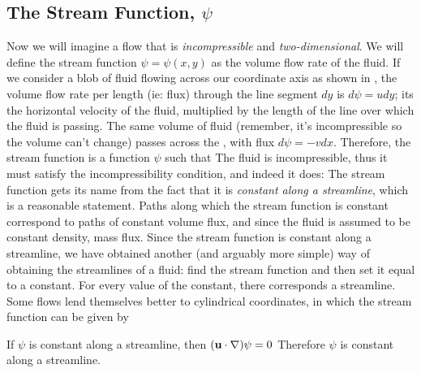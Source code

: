 \documentclass[12pt]{book}
\begin{document}
\subsection{The Stream Function, $\psi$}
Now we  will imagine a flow that is \textit{incompressible} and  \textit{two-dimensional}.  We will define the stream function $\psi=\psi(x,y)$ as the volume flow rate of the fluid.  If we consider a blob of fluid flowing across our coordinate axis as shown in , the volume flow rate per length (ie: flux) through the line segment $dy$ is $d\psi = udy$; its the horizontal velocity of the fluid, multiplied by the length of the line over which the fluid is passing. The same volume of fluid (remember, it's incompressible so the volume can't change) passes across the \xaxis, with flux $d\psi = -vdx$.  Therefore, the stream function is a function $\psi$ such that 
The fluid is incompressible, thus it must satisfy the incompressibility condition, and indeed it does:
The stream function gets its name from the fact that it is \textit{constant along a streamline}, which is a reasonable statement.  Paths along which the stream function is constant correspond to paths of constant volume flux, and since the fluid is assumed to be constant density, mass flux.  Since the stream function is constant along a streamline, we have obtained another (and arguably more simple) way of obtaining the streamlines of a fluid: find the stream function and then set it equal to a constant.  For every value of the constant, there corresponds a streamline.  Some flows lend themselves better to cylindrical coordinates, in which the stream function can be given by





{If $\psi$ is constant along a streamline, then $(\vec u \cdot \Nabla )\psi = 0$
Therefore $\psi$ is constant along a streamline.}
\end{document}
